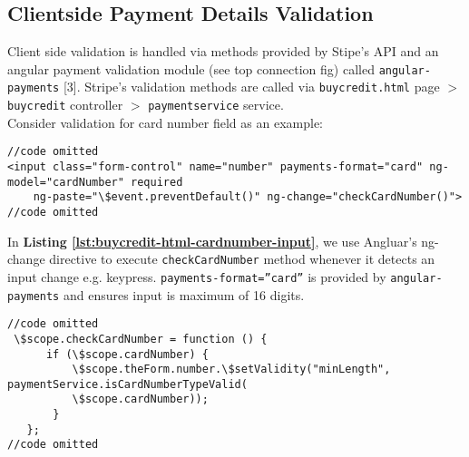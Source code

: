 \subsection{Clientside Payment Details Validation}
\label{subsec:clientside-payment-details-validation}

Client side validation is handled via methods provided by Stipe’s API and an angular payment validation module (see top connection fig) called \texttt{angular-payments} [3]. Stripe’s validation methods are called via \texttt{buycredit.html} page $>$ \texttt{buycredit} controller $>$ \texttt{paymentservice} service.\\

Consider validation for card number field as an example:\\

\begin{listing}[H]
\begin{verbatim}
//code omitted    
<input class="form-control" name="number" payments-format="card" ng-model="cardNumber" required
    ng-paste="\$event.preventDefault()" ng-change="checkCardNumber()">
//code omitted   
\end{verbatim}
\label{lst:buycredit-html-cardnumber-input}
\end{listing}

In \textbf{Listing \ref{lst:buycredit-html-cardnumber-input}}, we  use Angluar’s ng-change directive to execute \texttt{checkCardNumber} method whenever it detects an input change e.g. keypress. \texttt{payments-format=”card”} is provided by \texttt{angular-payments} and ensures input is maximum of 16 digits.\\

\begin{listing}[H]
\begin{verbatim}
//code omitted    
 \$scope.checkCardNumber = function () {
      if (\$scope.cardNumber) {
          \$scope.theForm.number.\$setValidity("minLength", paymentService.isCardNumberTypeValid(
          \$scope.cardNumber));
       }
   };
//code omitted   
\end{verbatim}
\label{lst:buycredit-controller-checkcardnumber-method}
\end{listing}

